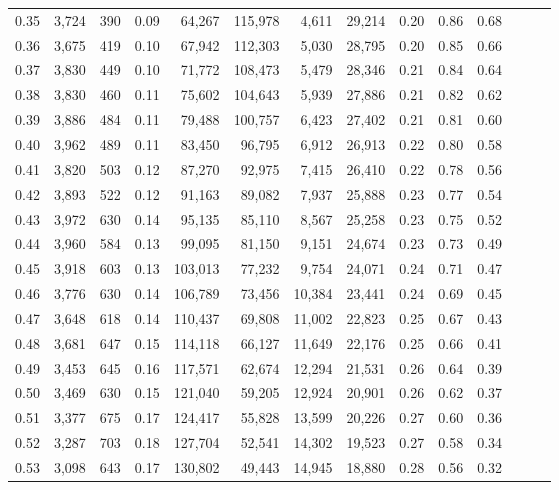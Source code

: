 \begin{tabular}{rrrrrrrrrrrrrr}
0.35 &  3,724 &  390 &  0.09 &   64,267 &  115,978 &   4,611 &  29,214 &  0.20 &  0.86 &      0.68 \\
0.36 &  3,675 &  419 &  0.10 &   67,942 &  112,303 &   5,030 &  28,795 &  0.20 &  0.85 &      0.66 \\
0.37 &  3,830 &  449 &  0.10 &   71,772 &  108,473 &   5,479 &  28,346 &  0.21 &  0.84 &      0.64 \\
0.38 &  3,830 &  460 &  0.11 &   75,602 &  104,643 &   5,939 &  27,886 &  0.21 &  0.82 &      0.62 \\
0.39 &  3,886 &  484 &  0.11 &   79,488 &  100,757 &   6,423 &  27,402 &  0.21 &  0.81 &      0.60 \\
0.40 &  3,962 &  489 &  0.11 &   83,450 &   96,795 &   6,912 &  26,913 &  0.22 &  0.80 &      0.58 \\
0.41 &  3,820 &  503 &  0.12 &   87,270 &   92,975 &   7,415 &  26,410 &  0.22 &  0.78 &      0.56 \\
0.42 &  3,893 &  522 &  0.12 &   91,163 &   89,082 &   7,937 &  25,888 &  0.23 &  0.77 &      0.54 \\
0.43 &  3,972 &  630 &  0.14 &   95,135 &   85,110 &   8,567 &  25,258 &  0.23 &  0.75 &      0.52 \\
0.44 &  3,960 &  584 &  0.13 &   99,095 &   81,150 &   9,151 &  24,674 &  0.23 &  0.73 &      0.49 \\
0.45 &  3,918 &  603 &  0.13 &  103,013 &   77,232 &   9,754 &  24,071 &  0.24 &  0.71 &      0.47 \\
0.46 &  3,776 &  630 &  0.14 &  106,789 &   73,456 &  10,384 &  23,441 &  0.24 &  0.69 &      0.45 \\
0.47 &  3,648 &  618 &  0.14 &  110,437 &   69,808 &  11,002 &  22,823 &  0.25 &  0.67 &      0.43 \\
0.48 &  3,681 &  647 &  0.15 &  114,118 &   66,127 &  11,649 &  22,176 &  0.25 &  0.66 &      0.41 \\
0.49 &  3,453 &  645 &  0.16 &  117,571 &   62,674 &  12,294 &  21,531 &  0.26 &  0.64 &      0.39 \\
0.50 &  3,469 &  630 &  0.15 &  121,040 &   59,205 &  12,924 &  20,901 &  0.26 &  0.62 &      0.37 \\
0.51 &  3,377 &  675 &  0.17 &  124,417 &   55,828 &  13,599 &  20,226 &  0.27 &  0.60 &      0.36 \\
0.52 &  3,287 &  703 &  0.18 &  127,704 &   52,541 &  14,302 &  19,523 &  0.27 &  0.58 &      0.34 \\
0.53 &  3,098 &  643 &  0.17 &  130,802 &   49,443 &  14,945 &  18,880 &  0.28 &  0.56 &      0.32 \\

\end{tabular}
